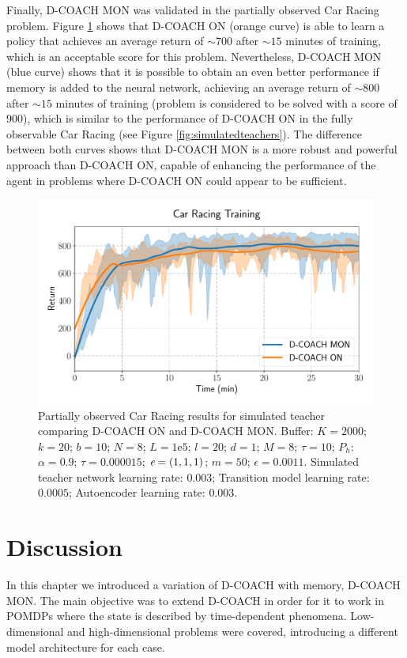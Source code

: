 Finally, D-COACH MON was validated in the partially observed Car Racing problem. Figure \ref{fig:po_cr} shows that D-COACH ON (orange curve) is able to learn a policy that achieves an average return of $\sim700$ after $\sim15$ minutes of training, which is an acceptable score for this problem. Nevertheless, D-COACH MON (blue curve) shows that it is possible to obtain an even better performance if memory is added to the neural network, achieving an average return of $\sim800$ after $\sim15$ minutes of training (problem is considered to be solved with a score of 900), which is similar to the performance of $\text{D-COACH}$ ON in the fully observable Car Racing (see Figure \ref{fig:simulatedteachers}). The difference between both curves shows that D-COACH MON is a more robust and powerful approach than $\text{D-COACH}$ ON, capable of enhancing the performance of the agent in problems where $\text{D-COACH}$ ON could appear to be sufficient.

\begin{figure}[H]
    \centering
    \includegraphics[width=0.7\linewidth]{imagenes/cap3/car_racing_lstm.pdf}
    \caption[Partially observed Car Racing results for simulated teacher comparing D-COACH ON and D-COACH MON.]{Partially observed Car Racing results for simulated teacher comparing D-COACH ON and D-COACH MON.  Buffer: $K = 2000$; $k=20$; $b=10$; $N = 8$; $L=1\mathrm{e}5$; $l=20$; $d=1$; $M=8$; $\tau=10$; $P_{h}$: $\alpha = 0.9$; $\tau = 0.000015$; $\emph{e}=(1, 1, 1)$; $m=50$; $\epsilon=0.0011$. Simulated teacher network learning rate: $0.003$; Transition model learning rate: $0.0005$; Autoencoder learning rate: $0.003$.}
    \label{fig:po_cr}
\end{figure}

\section{Discussion}
In this chapter we introduced a variation of D-COACH with memory, D-COACH MON. The main objective was to extend D-COACH in order for it to work in POMDPs where the state is described by time-dependent phenomena. Low-dimensional and high-dimensional problems were covered, introducing a different model architecture for each case. 

